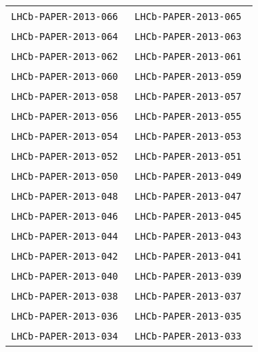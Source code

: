 \begin{center}
\begin{longtable}{ll}
\texttt{LHCb-PAPER-2013-066}~\cite{LHCb-PAPER-2013-066} &
\texttt{LHCb-PAPER-2013-065}~\cite{LHCb-PAPER-2013-065} \\
\texttt{LHCb-PAPER-2013-064}~\cite{LHCb-PAPER-2013-064} &
\texttt{LHCb-PAPER-2013-063}~\cite{LHCb-PAPER-2013-063} \\
\texttt{LHCb-PAPER-2013-062}~\cite{LHCb-PAPER-2013-062} &
\texttt{LHCb-PAPER-2013-061}~\cite{LHCb-PAPER-2013-061} \\
\texttt{LHCb-PAPER-2013-060}~\cite{LHCb-PAPER-2013-060} &
\texttt{LHCb-PAPER-2013-059}~\cite{LHCb-PAPER-2013-059} \\
\texttt{LHCb-PAPER-2013-058}~\cite{LHCb-PAPER-2013-058} &
\texttt{LHCb-PAPER-2013-057}~\cite{LHCb-PAPER-2013-057} \\
\texttt{LHCb-PAPER-2013-056}~\cite{LHCb-PAPER-2013-056} &
\texttt{LHCb-PAPER-2013-055}~\cite{LHCb-PAPER-2013-055} \\
\texttt{LHCb-PAPER-2013-054}~\cite{LHCb-PAPER-2013-054} &
\texttt{LHCb-PAPER-2013-053}~\cite{LHCb-PAPER-2013-053} \\
\texttt{LHCb-PAPER-2013-052}~\cite{LHCb-PAPER-2013-052} &
\texttt{LHCb-PAPER-2013-051}~\cite{LHCb-PAPER-2013-051} \\
\texttt{LHCb-PAPER-2013-050}~\cite{LHCb-PAPER-2013-050} &
\texttt{LHCb-PAPER-2013-049}~\cite{LHCb-PAPER-2013-049} \\
\texttt{LHCb-PAPER-2013-048}~\cite{LHCb-PAPER-2013-048} &
\texttt{LHCb-PAPER-2013-047}~\cite{LHCb-PAPER-2013-047} \\
\texttt{LHCb-PAPER-2013-046}~\cite{LHCb-PAPER-2013-046} &
\texttt{LHCb-PAPER-2013-045}~\cite{LHCb-PAPER-2013-045} \\
\texttt{LHCb-PAPER-2013-044}~\cite{LHCb-PAPER-2013-044} &
\texttt{LHCb-PAPER-2013-043}~\cite{LHCb-PAPER-2013-043} \\
\texttt{LHCb-PAPER-2013-042}~\cite{LHCb-PAPER-2013-042} &
\texttt{LHCb-PAPER-2013-041}~\cite{LHCb-PAPER-2013-041} \\
\texttt{LHCb-PAPER-2013-040}~\cite{LHCb-PAPER-2013-040} &
\texttt{LHCb-PAPER-2013-039}~\cite{LHCb-PAPER-2013-039} \\
\texttt{LHCb-PAPER-2013-038}~\cite{LHCb-PAPER-2013-038} &
\texttt{LHCb-PAPER-2013-037}~\cite{LHCb-PAPER-2013-037} \\
\texttt{LHCb-PAPER-2013-036}~\cite{LHCb-PAPER-2013-036} &
\texttt{LHCb-PAPER-2013-035}~\cite{LHCb-PAPER-2013-035} \\
\texttt{LHCb-PAPER-2013-034}~\cite{LHCb-PAPER-2013-034} &
\texttt{LHCb-PAPER-2013-033}~\cite{LHCb-PAPER-2013-033} \\

\end{longtable}
\end{center}
